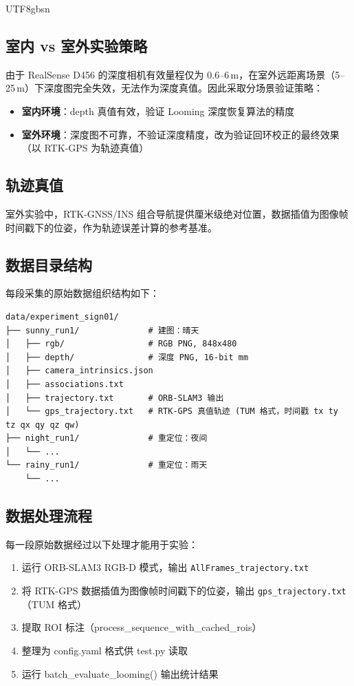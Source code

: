 \documentclass{article}
\begin{document}
\begin{CJK}{UTF8}{gbsn}
\subsection{室内 vs 室外实验策略}

由于 RealSense D456 的深度相机有效量程仅为 0.6--6\,m，在室外远距离场景（5--25\,m）下深度图完全失效，无法作为深度真值。因此采取分场景验证策略：

\begin{itemize}
    \item \textbf{室内环境}：depth 真值有效，验证 Looming 深度恢复算法的精度
    \item \textbf{室外环境}：深度图不可靠，不验证深度精度，改为验证回环校正的最终效果（以 RTK-GPS 为轨迹真值）
\end{itemize}

\subsection{轨迹真值}

室外实验中，RTK-GNSS/INS 组合导航提供厘米级绝对位置，数据插值为图像帧时间戳下的位姿，作为轨迹误差计算的参考基准。

\subsection{数据目录结构}

每段采集的原始数据组织结构如下：

\begin{verbatim}
data/experiment_sign01/
├── sunny_run1/              # 建图：晴天
│   ├── rgb/                 # RGB PNG, 848x480
│   ├── depth/               # 深度 PNG, 16-bit mm
│   ├── camera_intrinsics.json
│   ├── associations.txt
│   ├── trajectory.txt       # ORB-SLAM3 输出
│   └── gps_trajectory.txt   # RTK-GPS 真值轨迹 (TUM 格式，时间戳 tx ty tz qx qy qz qw)
├── night_run1/              # 重定位：夜间
│   └── ...
└── rainy_run1/              # 重定位：雨天
    └── ...
\end{verbatim}

\subsection{数据处理流程}

每一段原始数据经过以下处理才能用于实验：

\begin{enumerate}
    \item 运行 ORB-SLAM3 RGB-D 模式，输出 \texttt{AllFrames\_trajectory.txt}
    \item 将 RTK-GPS 数据插值为图像帧时间戳下的位姿，输出 \texttt{gps\_trajectory.txt}（TUM 格式）
    \item 提取 ROI 标注（process\_sequence\_with\_cached\_rois）
    \item 整理为 config.yaml 格式供 test.py 读取
    \item 运行 batch\_evaluate\_looming() 输出统计结果
\end{enumerate}


\end{CJK}
\end{document}
